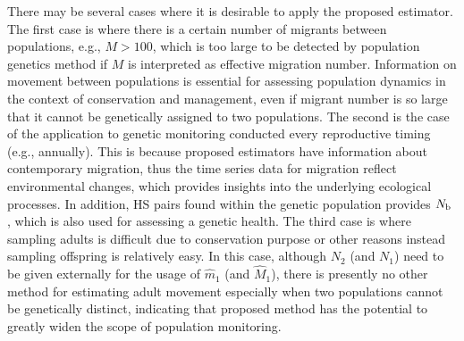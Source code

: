 \documentclass[12pt, English]{article}
\begin{document}
\begin{spacing}{1.9}
There may be several cases where it is desirable to apply the proposed estimator. The first case is where there is a certain number of migrants between populations, e.g., $M>100$, which is too large to be detected by population genetics method if $M$ is interpreted as effective migration number. Information on movement between populations is essential for assessing population dynamics in the context of conservation and management, even if migrant number is so large that it cannot be genetically assigned to two populations. The second is the case of the application to genetic monitoring conducted every reproductive timing (e.g., annually). This is because proposed estimators have information about contemporary migration, thus the time series data for migration reflect environmental changes, which provides insights into the underlying ecological processes. In addition, HS pairs found within the genetic population provides $N_{\rm b}$ \cite[]{wang2009new}, which is also used for assessing a genetic health. The third case is where sampling adults is difficult due to conservation purpose or other reasons instead sampling offspring is relatively easy. In this case, although $N_2$ (and $N_1$) need to be given externally for the usage of $\hat m_1$ (and $\hat M_1$), there is presently no other method for estimating adult movement especially when two populations cannot be genetically distinct, indicating that proposed method has the potential to greatly widen the scope of population monitoring. 


\end{spacing}
\end{document}

